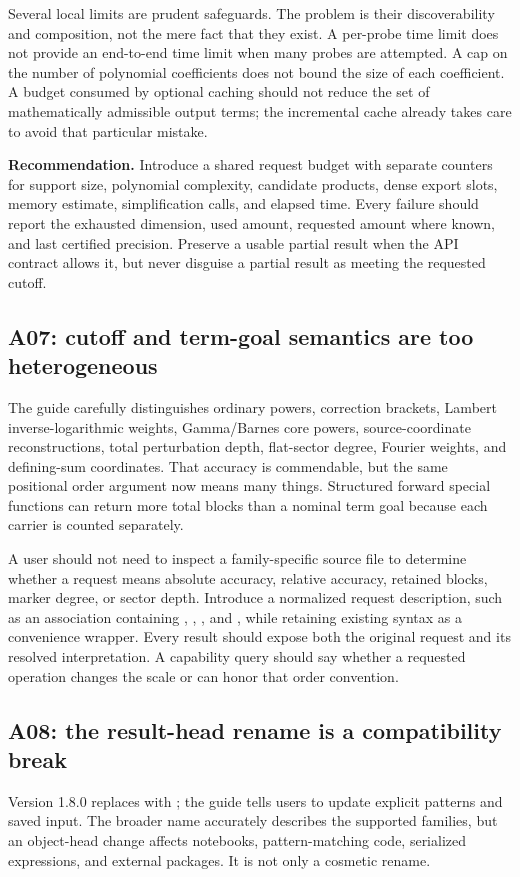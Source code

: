 Several local limits are prudent safeguards. The problem is their discoverability and composition, not the mere fact that they exist. A per-probe time limit does not provide an end-to-end time limit when many probes are attempted. A cap on the number of polynomial coefficients does not bound the size of each coefficient. A budget consumed by optional caching should not reduce the set of mathematically admissible output terms; the incremental cache already takes care to avoid that particular mistake.\cite{incremental}

\textbf{Recommendation.} Introduce a shared request budget with separate counters for support size, polynomial complexity, candidate products, dense export slots, memory estimate, simplification calls, and elapsed time. Every failure should report the exhausted dimension, used amount, requested amount where known, and last certified precision. Preserve a usable partial result when the API contract allows it, but never disguise a partial result as meeting the requested cutoff.

\subsection{A07: cutoff and term-goal semantics are too heterogeneous}
The guide carefully distinguishes ordinary powers, correction brackets, Lambert inverse-logarithmic weights, Gamma/Barnes core powers, source-coordinate reconstructions, total perturbation depth, flat-sector degree, Fourier weights, and defining-sum coordinates. That accuracy is commendable, but the same positional order argument now means many things. Structured forward special functions can return more total blocks than a nominal term goal because each carrier is counted separately.\cite{guide}

A user should not need to inspect a family-specific source file to determine whether a request means absolute accuracy, relative accuracy, retained blocks, marker degree, or sector depth. Introduce a normalized request description, such as an association containing , , , and , while retaining existing syntax as a convenience wrapper. Every result should expose both the original request and its resolved interpretation. A capability query should say whether a requested operation changes the scale or can honor that order convention.

\subsection{A08: the result-head rename is a compatibility break}
Version 1.8.0 replaces  with ; the guide tells users to update explicit patterns and saved input. The broader name accurately describes the supported families, but an object-head change affects notebooks, pattern-matching code, serialized expressions, and external packages. It is not only a cosmetic rename.\cite{guide,revision}

